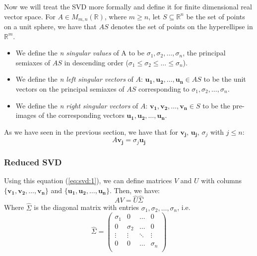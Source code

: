\documentclass[12pt,reqno,twoside,titlepage]{article}
\theoremstyle{definition}
\theoremstyle{theorem}
\begin{document}
Now we will treat the SVD more formally and define it for finite dimensional real vector space.
For $A \in M_{m,n}(\mathbb{R})$, where $m \geq n$, let  $S \subseteq \mathbb{R}^n$ be the set of points on a unit sphere, we have that $AS$ denotes the set of points on the hyperellipse in $\mathbb{R}^m$.
\begin{itemize}
\item We define the \emph{n singular values} of A to be $\sigma_1, \sigma_2, \dots, \sigma_n$, the principal semiaxes of $AS$ in descending order ($\sigma_1 \leq \sigma_2 \leq \dots \leq \sigma_n$).
\item We define the \emph{n left singular vectors} of $A$: $\mathbf{u_1}, \mathbf{u_2}, \dots, \mathbf{u_n} \in AS$ to be the unit vectors on the principal semiaxes of $AS$ corresponding to $\sigma_1, \sigma_2, \dots, \sigma_n$.
\item We define the \emph{n right singular vectors} of $A$: $\mathbf{v_1}, \mathbf{v_2}, \dots, \mathbf{v_n} \in S$ to be the pre-images of the corresponding vectors $\mathbf{u_1}, \mathbf{u_2}, \dots, \mathbf{u_n}$.
\end{itemize}


As we have seen in the previous section, we have that for $\mathbf{v_j}$, $\mathbf{u_j}$, $\sigma_j$ with $j \leq n$:
\begin{equation}
  \label{eq:svd:1}
  A\mathbf{v_j} = \sigma_j\mathbf{u_j}
\end{equation}
\subsubsection{Reduced SVD}
\label{sec:svd:2:1}

Using this equation (\ref{eq:svd:1}), we can define matrices $V$ and $U$ with columns $\{\mathbf{v_1}, \mathbf{v_2}, \dots, \mathbf{v_n}\}$ and $\{\mathbf{u_1}, \mathbf{u_2}, \dots, \mathbf{u_n}\}$. Then, we have:
\begin{equation}
  \label{eq:svd:2}
  AV  = \hat{U} \hat{\Sigma}
\end{equation}
Where $\hat{\Sigma}$ is the diagonal matrix with entries $\sigma_1, \sigma_2, \dots, \sigma_n$, i.e.\
\[
  \hat{\Sigma} =
  \begin{pmatrix}
    \sigma_1 & 0 & \dots & 0 \\
    0 & \sigma_2 &  \dots & 0 \\
    \vdots & \vdots & \ddots & \vdots \\
    0 & 0 & \dots & \sigma_n \\
  \end{pmatrix}
\]
\end{document}
